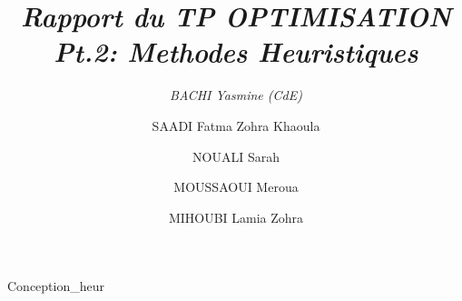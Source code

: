 \documentclass[12pt,a4paper, titlepage]{article}
\title{\emph{Rapport du TP OPTIMISATION Pt.2: Methodes Heuristiques} }
\author{ 
    \emph{BACHI Yasmine (CdE)}
    \and
    SAADI Fatma Zohra Khaoula
    \and 
    NOUALI Sarah
    \and 
    MOUSSAOUI Meroua
    \and 
    MIHOUBI Lamia Zohra}
\begin{document}
\maketitle
{Conception_heur}
\end{document}
